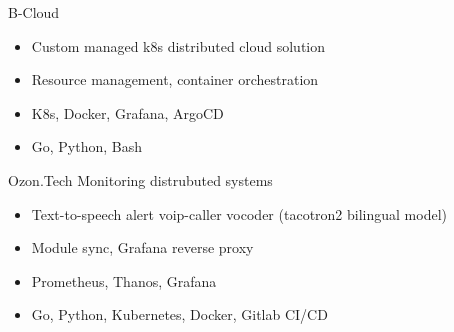 \documentclass[10pt,a4paper,ragged2e]{altacv}
\begin{document}

\begin{fullwidth}
\makecvheader
\end{fullwidth}



B-Cloud
\begin{itemize}
    \item Custom managed k8s distributed cloud solution
    \item Resource management, container orchestration
    \item K8s, Docker, Grafana, ArgoCD
    \item Go, Python, Bash
\end{itemize}
\bigskip

Ozon.Tech Monitoring distrubuted systems
\begin{itemize}
    \item Text-to-speech alert voip-caller vocoder (tacotron2 bilingual model)
    \item Module sync, Grafana reverse proxy
    \item Prometheus, Thanos, Grafana
    \item Go, Python, Kubernetes, Docker, Gitlab CI/CD
\end{itemize}
\bigskip
\end{document}
